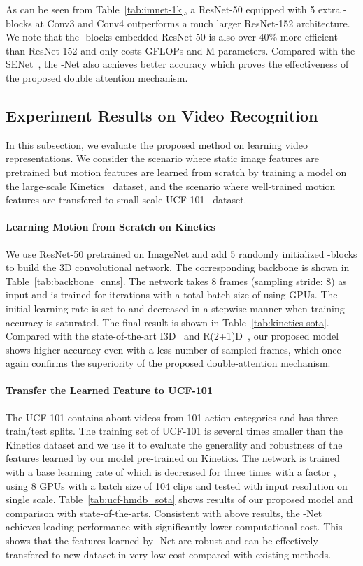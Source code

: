 \documentclass{article}
\begin{document}
As can be seen from Table~\ref{tab:imnet-1k}, a ResNet-50 equipped with 5 extra -blocks at Conv3 and Conv4 outperforms a much larger ResNet-152 architecture. We note that the -blocks embedded ResNet-50 is also over 40\% more efficient than ResNet-152 and only costs  GFLOPs and  M parameters. Compared with the SENet~\cite{hu2017}, the -Net also achieves better accuracy which proves the effectiveness of the proposed double attention mechanism.


\subsection{Experiment Results on Video Recognition}

In this subsection, we evaluate the proposed method on learning video representations. We consider the scenario where static image features are pretrained but motion features are learned from scratch by training a model on the large-scale Kinetics~\cite{carreira2017quo} dataset, and the scenario where well-trained motion features are transfered to small-scale UCF-101~\cite{soomro2012ucf101} dataset.


\paragraph{Learning Motion from Scratch on Kinetics}
We use ResNet-50 pretrained on ImageNet and add 5 randomly initialized -blocks to build the 3D convolutional network. The corresponding backbone is shown in Table~\ref{tab:backbone_cnns}. The network takes 8 frames (sampling stride: 8) as input and is trained for  iterations with a total batch size of  using  GPUs. The initial learning rate is set to  and decreased in a stepwise manner when training accuracy is saturated. The final result is shown in Table~\ref{tab:kinetics-sota}. Compared with the state-of-the-art I3D~\cite{carreira2017quo} and R(2+1)D~\cite{tran2017closer}, our proposed model shows higher accuracy even with a less number of sampled frames, which once again confirms the superiority of the proposed double-attention mechanism.


\paragraph{Transfer the Learned Feature to UCF-101}
The UCF-101 contains about  videos from 101 action categories and has three train/test splits. The training set of UCF-101 is several times smaller than the Kinetics dataset and we use it to evaluate the generality and robustness of the features learned by our model pre-trained on Kinetics. The network is trained with a base learning rate of  which is decreased for three times with a factor , using 8 GPUs with a batch size of 104 clips and tested with  input resolution on single scale. Table~\ref{tab:ucf-hmdb_sota} shows results of our proposed model and comparison with state-of-the-arts. Consistent with above results, the -Net achieves leading performance with significantly lower computational cost. This shows that the features learned by -Net are robust and can be effectively transfered to new dataset in very low cost compared with existing methods. 
\end{document}
